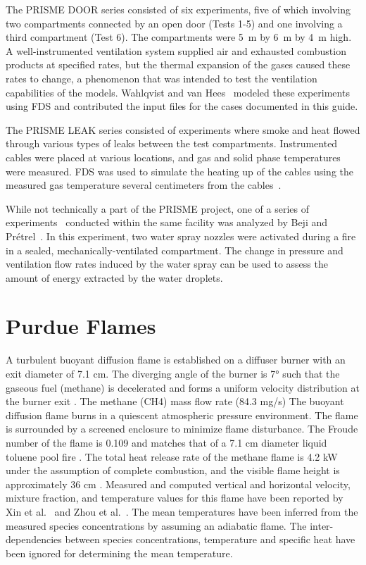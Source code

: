 The PRISME DOOR series consisted of six experiments, five of which involving two compartments connected by an open door (Tests 1-5) and one involving a third compartment (Test 6). The compartments were 5~m by 6~m by 4~m high. A well-instrumented ventilation system supplied air and exhausted combustion products at specified rates, but the thermal expansion of the gases caused these rates to change, a phenomenon that was intended to test the ventilation capabilities of the models. Wahlqvist and van Hees~\cite{Wahlqvist:FSJ} modeled these experiments using FDS and contributed the input files for the cases documented in this guide.

The PRISME LEAK series consisted of experiments where smoke and heat flowed through various types of leaks between the test compartments. Instrumented cables were placed at various locations, and gas and solid phase temperatures were measured. FDS was used to simulate the heating up of the cables using the measured gas temperature several centimeters from the cables~\cite{Dreisbach:Interflam}.

While not technically a part of the PRISME project, one of a series of experiments~\cite{Pretrel:FSJ2017} conducted within the same facility was analyzed by Beji and Pr\'{e}trel~\cite{Beji:FSJ2023}. In this experiment, two water spray nozzles were activated during a fire in a sealed, mechanically-ventilated compartment. The change in pressure and ventilation flow rates induced by the water spray can be used to assess the amount of energy extracted by the water droplets.

\section{Purdue Flames}
\label{Purdue_Flames_Description}

A turbulent buoyant diffusion flame is established on a diffuser burner with an exit diameter of 7.1 cm. The diverging angle of the burner is 7\unit{\degree} such that the gaseous fuel (methane) is decelerated and forms a uniform velocity distribution at the burner exit \cite{Xin:CF2005}. The methane (CH4) mass flow rate (84.3 mg/s) The buoyant diffusion flame burns in a quiescent atmospheric pressure environment. The flame is surrounded by a screened enclosure to minimize flame disturbance. The Froude number of the flame is 0.109 and matches that of a 7.1 cm diameter liquid toluene pool fire \cite{Xin:CF2005,Zhou:CS1998}. The total heat release rate of the methane flame is 4.2 kW under the assumption of complete combustion, and the visible flame height is approximately 36 cm \cite{Xin:CF2005}. Measured and computed vertical and horizontal velocity, mixture fraction, and temperature values for this flame have been reported by Xin et al.~\cite{Xin:CF2005,Xin:PhD2002} and Zhou et al.~\cite{Zhou:CS1998,Zhou:PurduePhD1999}. The mean temperatures have been inferred from the measured species concentrations \cite{Xin:CF2005} by assuming an adiabatic flame. The inter-dependencies between species concentrations, temperature and specific heat have been ignored for determining the mean temperature.

